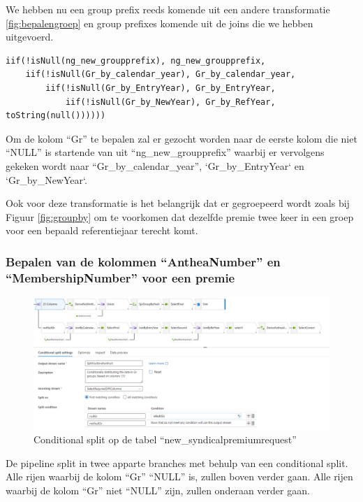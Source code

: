 We hebben nu een group prefix reeds komende uit een andere transformatie \ref{fig:bepalengroep} en group prefixes komende uit de joins die we hebben uitgevoerd.

\begin{lstlisting}[language={}, caption={Expressie van derive op ``new\_syndicalpremiumrequest''.}, style=myStyle]
iif(!isNull(ng_new_groupprefix), ng_new_groupprefix, 
    iif(!isNull(Gr_by_calendar_year), Gr_by_calendar_year,
        iif(!isNull(Gr_by_EntryYear), Gr_by_EntryYear,
            iif(!isNull(Gr_by_NewYear), Gr_by_RefYear, toString(null())))))
\end{lstlisting}

Om de kolom ``Gr'' te bepalen zal er gezocht worden naar de eerste kolom die niet ``NULL'' is startende van uit ``ng\_new\_groupprefix'' waarbij er vervolgens gekeken wordt naar ``Gr\_by\_calendar\_year'', `Gr\_by\_EntryYear` en `Gr\_by\_NewYear`.

Ook voor deze transformatie is het belangrijk dat er gegroepeerd wordt zoals bij Figuur \ref{fig:groupby} om te voorkomen dat dezelfde premie twee keer in een groep voor een bepaald referentiejaar terecht komt.

\subsubsection{Bepalen van de kolommen ``AntheaNumber'' en ``MembershipNumber'' voor een premie}

\begin{figure}[H]
    \centering
    \includegraphics[width=1\textwidth]{./graphics/adf/member_1.png}
    \caption{Conditional split op de tabel ``new\_syndicalpremiumrequest''}
\end{figure}

De pipeline split in twee apparte branches met behulp van een conditional split. Alle rijen waarbij de kolom ``Gr'' ``NULL'' is, zullen boven verder gaan. Alle rijen waarbij de kolom ``Gr'' niet ``NULL'' zijn, zullen onderaan verder gaan.

